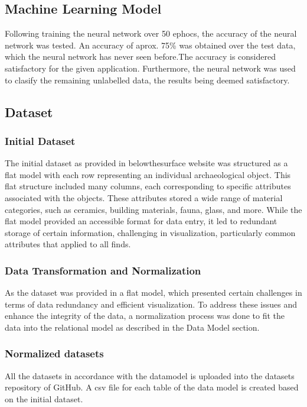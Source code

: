 \subsection{Machine Learning Model}
Following training the neural network over 50 ephocs, the accuracy of the neural network was tested. An accuracy of aprox. 75\% was obtained over the test data, which the neural network has never seen before.The accuracy is considered satisfactory for the given application. Furthermore, the neural network was used to clasify the remaining unlabelled data, the results being deemed satisfactory.

\subsection{Dataset}

\subsubsection{Initial Dataset}
The initial dataset as provided in belowthesurface website was structured as a flat model with each row representing an individual archaeological object. This flat structure included many columns, each corresponding to specific attributes associated with the objects. These attributes stored a wide range of material categories, such as ceramics, building materials, fauna, glass, and more. While the flat model provided an accessible format for data entry, it led to redundant storage of certain information, challenging in visualization, particularly common attributes that applied to all finds.

\subsubsection{Data Transformation and Normalization}
As the dataset was provided in a flat model, which presented certain challenges in terms of data redundancy and efficient visualization. To address these issues and enhance the integrity of the data, a normalization process was done to fit the data into the relational model as described in the Data Model section.

\subsubsection{Normalized datasets}
All the datasets in accordance with the datamodel is uploaded into the datasets repository of GitHub. A csv file for each table of the data model is created based on the initial dataset.


